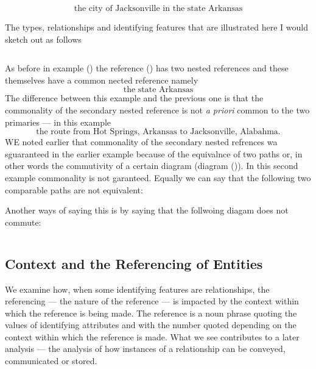 \begin{equation}
\mbox{the city of Jacksonville in the state  Arkansas}
\end{equation}

The types, relationships and identifying features that are illustrated here
I would sketch out as follows

\begin{equation*}

\end{equation*}
\begin{equation*}

\end{equation*}


\mynote 
As before in example () the reference () has two nested references and these themselves have a common nected reference namely
\begin{equation*}
\mbox{the state Arkansas}
\end{equation*}
The difference between this example and the previous one is that the commonality of the secondary nested reference is not  \textit{a priori}
 common to the two primaries --- in this example
 \begin{equation*}
 \mbox{the route from Hot Springs, Arkansas to Jacksonville, Alabahma.}
\end{equation*}
\mynote
WE noted earlier that commonality of the secondary nested refrences wa sguaranteed in the earlier example because of the equivalnce of two paths or, in other words the commutivity of a certain diagram (diagram ()).
In this second example commonality is not garanteed. Equally we can say that the following two comparable paths are not equivalent:

Another ways of saying this is by saying that the follwoing diagam does not commute:
\begin{equation*}

\end{equation*}

\begin{equation*}

\end{equation*}

\subsection{Context and the Referencing of Entities}
\mynote
We examine how,  when some identifying features are relationships, the referencing 
--- the nature of the reference ---   
is impacted by the context within which the reference is being made. 
The reference is  a noun phrase quoting the values of identifying attributes
and with the number quoted depending on 
the context within which the reference is made.
What we see contributes to a later analysis --- the analysis of  how 
instances of a relationship can be conveyed, communicated or stored.
